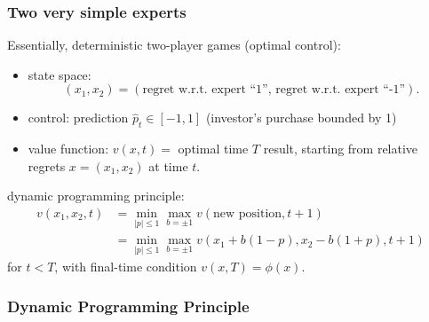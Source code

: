 \documentclass{beamer}
\begin{document}
\begin{frame}
\frametitle{Two very simple experts}
Essentially, deterministic two-player games (optimal control):
\begin{itemize}
\pause
\item{\color{red}state space:}$$(x_1,x_2) = (\text{regret w.r.t.  expert ``1'', regret w.r.t.  expert ``-1''}).$$
\pause
\item {\color{red}control:} prediction $\hat{p}_t\in[-1,1]$ ({\color{blue}investor's purchase bounded by 1}) 
\pause
\item {\color{red}value function:} $v(x,t) = $ optimal time $T$ result, starting from relative regrets $x = (x_1,x_2)$ at time $t$. 
\end{itemize}

{\color{red}dynamic programming principle:}
\begin{align*}
v(x_1,x_2,t) &= \min_{|p|\le 1}\max_{b = \pm 1}v(\text{new position},t+1)\\
                    & = \min_{|p|\le 1}\max_{b = \pm 1}v(x_1 + b(1-p),x_2-b(1+p),t+1)		
\end{align*}
for $t<T$, with final-time condition $v(x,T) = \phi(x).$

\end{frame}

\begin{frame}
\frametitle{Dynamic Programming Principle}

\end{frame}
\end{document}
